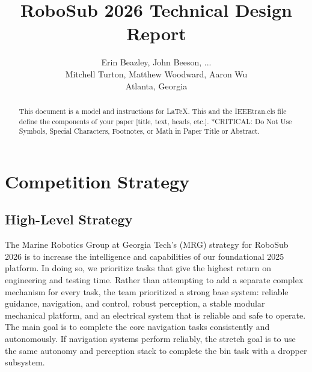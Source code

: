 \documentclass[conference]{IEEEtran}
\begin{document}
\pagestyle{fancy}
\fancyhf{}                         %

\rhead{\footnotesize \thepage}                   %
\renewcommand{\headrulewidth}{0pt} %
\setlength{\headheight}{8pt}

\title{\myfont RoboSub 2026 Technical Design Report} 
\author{{Erin Beazley, John Beeson, ... }\\
 Mitchell Turton, Matthew Woodward, Aaron Wu \\
Atlanta, Georgia \\
}

\maketitle
\thispagestyle{fancy}

\begin{abstract}
This document is a model and instructions for \LaTeX.
This and the IEEEtran.cls file define the components of your paper [title, text, heads, etc.]. *CRITICAL: Do Not Use Symbols, Special Characters, Footnotes, 
or Math in Paper Title or Abstract.
\end{abstract}


\section{Competition Strategy}

\subsection{High-Level Strategy}

The Marine Robotics Group at Georgia Tech's (MRG) strategy for RoboSub 2026 is to increase the intelligence and capabilities of our foundational 2025 platform. In doing so, we prioritize tasks that give the highest return on engineering and testing time. Rather than attempting to add a separate complex mechanism for every task, the team prioritized a strong base system: reliable guidance, navigation, and control, robust perception, a stable modular mechanical platform, and an electrical system that is reliable and safe to operate. The main goal is to complete the core navigation tasks consistently and autonomously. If navigation systems perform reliably, the stretch goal is to use the same autonomy and perception stack to complete the bin task with a dropper subsystem.
\end{document}
